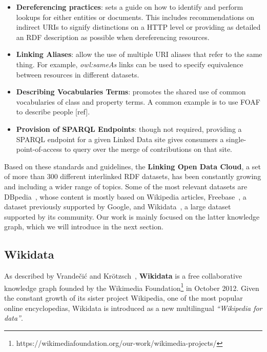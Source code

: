 \begin{itemize}
    \item \textbf{Dereferencing practices}: sets a guide on how to identify and perform lookups 
    for either entities or documents. This includes recommendations on indirect URIs to signify 
    distinctions on a HTTP level or providing as detailed an RDF description as possible when 
    dereferencing resources. 
    \item \textbf{Linking Aliases}: allow the use of multiple URI aliases that refer to the same 
    thing. For example, \textit{owl:sameAs} links can be used to specify equivalence between 
    resources in different datasets.
    \item \textbf{Describing Vocabularies Terms}: promotes the shared use of common vocabularies 
    of class and property terms. A common example is to use FOAF to describe people [ref].
    \item \textbf{Provision of SPARQL Endpoints}: though not required, providing a SPARQL endpoint 
    for a given Linked Data site gives consumers a single-point-of-access to query over the merge 
    of contributions on that site.
\end{itemize} %

Based on these standards and guidelines, the \textbf{Linking Open Data Cloud}, a set of more than 
300 different interlinked RDF datasets, has been constantly growing and including a wider range of 
topics. Some of the most relevant datasets are DBpedia~\cite{KG:dbpedia}, whose content is mostly 
based on Wikipedia articles, Freebase~\cite{KG:freebase}, a dataset previously supported by Google, 
and Wikidata~\cite{KG:wikidata}, a large dataset supported by its community. Our work is mainly 
focused on the latter knowledge graph, which we will introduce in the next section.

\subsection{Wikidata} 
As described by Vrandečić and Krötzsch~\cite{KG:wikidata}, \textbf{Wikidata} is a free 
collaborative knowledge graph founded by the Wikimedia Foundation\footnote{https://wikimediafoundation.org/our-work/wikimedia-projects/} 
in October 2012. Given the constant growth of its sister project Wikipedia, one of the most 
popular online encyclopedias, Wikidata is introduced as a new multilingual 
\textit{“Wikipedia for data”}. 

